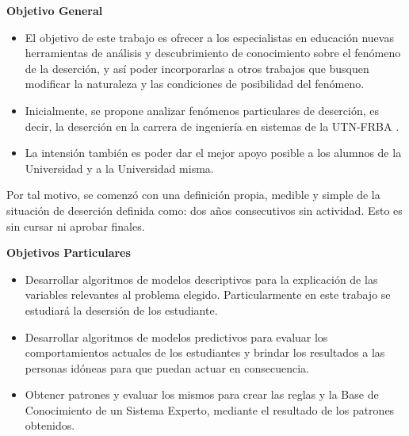 
\textbf{Objetivo General}\\
\begin{itemize}
	\item El objetivo de este trabajo es ofrecer a los especialistas en educación nuevas herramientas de análisis y descubrimiento de conocimiento sobre el fenómeno de la deserción, y así poder incorporarlas a otros trabajos que busquen modificar la naturaleza y las condiciones de posibilidad del fenómeno.
	\item Inicialmente, se propone analizar fenómenos particulares de deserción, es decir, la deserción en la carrera de ingeniería en sistemas de la UTN-FRBA .
	\item La intensión también es poder dar el mejor apoyo posible a los alumnos de la Universidad y a la Universidad misma.
\end{itemize}

Por tal motivo, se comenzó con una definición propia, medible y
simple de la situación de deserción definida como: dos años consecutivos sin actividad. Esto es sin cursar ni aprobar finales.


\textbf{Objetivos Particulares}
\begin{itemize}
	\item Desarrollar algoritmos de modelos descriptivos para la explicación de las variables relevantes al problema elegido. Particularmente en este trabajo se estudiará la desersión de los estudiante.
	\item Desarrollar algoritmos de modelos predictivos para evaluar los comportamientos actuales de los estudiantes y brindar los resultados a las personas idóneas para que puedan actuar en consecuencia.
	\item Obtener patrones y evaluar los mismos para crear las reglas y la Base de Conocimiento de un Sistema Experto, mediante el resultado de los patrones obtenidos.
\end{itemize}




